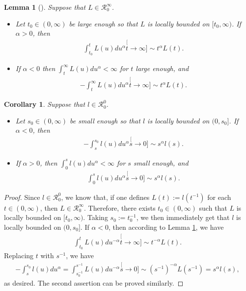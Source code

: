 \documentclass[UTF8]{pkuthss}
\theoremstyle{plain}
\newtheorem{lem}[thm]{Lemma}
\newtheorem{cor}[thm]{Corollary}
\theoremstyle{definition}
\numberwithin{equation}{section}
\begin{document}
\begin{lem}[{\cite[Propositions 1.5.8 and 1.5.10]{BinghamGoldieTeugels1989Regular}}]
\label{lem: exchange slowly varying function and integration}
	Suppose that $L\in \mathcal R^\infty_0$.
\begin{itemize}
\item
	Let $t_0\in (0,\infty)$ be large enough so that $L$ is locally bounded on $[t_0,\infty)$. If $\alpha>0 $, then
\begin{align}
	\int_{t_0}^t L(u)du^\alpha
	\stackrel[t\to \infty]{}{\sim} t^\alpha L(t).
\end{align}
\item
	If $\alpha< 0$ then $\int_t^\infty L(u) du^\alpha < \infty$ for $t$ large enough, and
\begin{align}
	-\int_t^\infty L(u)du^\alpha
	\stackrel[t\to \infty]{}{\sim} t^\alpha L(t).
\end{align}
\end{itemize}
\end{lem}

\begin{cor}
\label{cro: power law and ingetration}
	Suppose that $l\in \mathcal R^0_0$.
\begin{itemize}
\item
	Let $s_0\in (0,\infty)$ be small enough so that $l$ is locally bounded on $(0,s_0]$.
	If $\alpha < 0$, then
\begin{align}
	-\int_s^{s_0} l(u)du^\alpha
	\stackrel[s\to 0]{}{\sim} s^{\alpha} l(s).
\end{align}
\item
	If $\alpha > 0$, then $\int_0^s l(u)du^\alpha<\infty$ for $s$ small enough, and
\begin{align}
	\int_0^s l(u)du^\alpha
	\stackrel[s\to 0]{}{\sim} s^{\alpha} l(s).
\end{align}
\end{itemize}
\end{cor}	

\begin{proof}
	Since $l \in \mathcal R^0_0$, we know that, if one defines $L(t):=l(t^{-1})$ for each $t\in (0,\infty)$, then $ L \in \mathcal R^\infty_0$.
	Therefore, there exists $t_0\in (0,\infty)$ such that $L$ is locally bounded on $[t_0,\infty)$.
	Taking $s_0:= t_0^{-1}$, we then immediately get that $l$ is locally bounded on $(0,s_0]$.
	If $\alpha<0 $, then according to Lemma \ref{lem: exchange slowly varying function and integration}, we have
\begin{align}
	\int_{t_0}^t L(u)du^{-\alpha}
	\stackrel[t\to \infty]{}{\sim} t^{-\alpha}  L(t).
\end{align}
	Replacing $t$ with $s^{-1}$, we have
\begin{align}
	-\int_{s}^{s_0} l(u)du^{\alpha}
	=\int_{s_0^{-1}}^{s^{-1}} L(u)du^{-\alpha}
	\stackrel[s\to 0]{}{\sim}  (s^{-1})^{-\alpha}L(s^{-1})
	=s^\alpha l(s),
\end{align}
	as desired.
	The second assertion can be proved similarly.
\end{proof}
\end{document}
